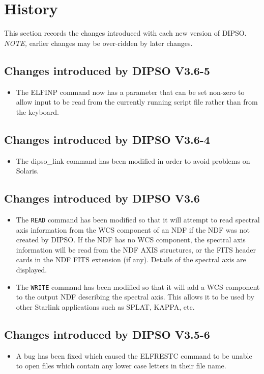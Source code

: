 \documentclass[twoside,11pt,noabs,nolof]{starlink}
\begin{document}
\section{\label{APP:HISTORY}History}


This section records the changes introduced with each new version of DIPSO.
\emph{NOTE,} earlier changes may be over-ridden by later changes.

\subsection{Changes introduced by DIPSO V3.6-5}
\begin{itemize}
\item The ELFINP command now has a parameter that can be set non-zero to
allow input to be read from the currently running script file rather than
from the keyboard.
\end{itemize}

\subsection{Changes introduced by DIPSO V3.6-4}
\begin{itemize}
\item The dipso\_link command has been modified in order to avoid
problems on Solaris.
\end{itemize}

\subsection{Changes introduced by DIPSO V3.6}
\begin{itemize}
\item The \texttt{READ} command has been modified so that it will attempt to
read spectral axis information from the WCS component of an NDF if the NDF
was not created by DIPSO. If the NDF has no WCS component, the spectral
axis information will be read from the NDF AXIS structures, or the FITS header
cards in the NDF FITS extension (if any). Details of the spectral axis are
displayed.
\item The \texttt{WRITE} command has been modified so that it will add a WCS
component to the output NDF describing the spectral axis. This allows it
to be used by other Starlink applications such as SPLAT, KAPPA, etc.
\end{itemize}

\subsection{Changes introduced by DIPSO V3.5-6}
\begin{itemize}
\item A bug has been fixed which caused the ELFRESTC command to be unable to
open files which contain any lower case letters in their file name.
\end{itemize}
\end{document}

